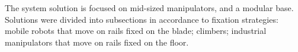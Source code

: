 The system solution is focused on mid-sized manipulators, and a modular base.
Solutions were divided into subsections in accordance to fixation strategies:
mobile robots that move on rails fixed on the blade; climbers; industrial
manipulators that move on rails fixed on the floor.






 
%